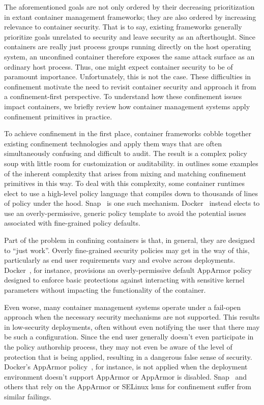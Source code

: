 \documentclass[
  fontsize=12pt,
  titlepage=firstiscover,
  paper=letter,
oneside,
  cleardoublepage=plain,
  parskip=half-,
  DIV=10,
  parindent,
  appendixprefix,
  chapterprefix,
  listof=totoc,
]{scrbook}
\begin{document}
The aforementioned goals are not only ordered by their decreasing prioritization in extant
container management frameworks; they are also ordered by increasing relevance to
container security. That is to say, existing frameworks generally prioritize goals
unrelated to security and leave security as an afterthought. Since containers are really
just process groups running directly on the host operating system, an unconfined container
therefore exposes the same attack surface as an ordinary host process. Thus, one might
expect container security to be of paramount importance. Unfortunately, this is not the
case. These difficulties in confinement motivate the need to revisit container security
and approach it from a confinement-first perspective. To understand how these confinement
issues impact containers, we briefly review how container management systems apply
confinement primitives in practice.

To achieve confinement in the first place, container frameworks cobble together existing
confinement technologies and apply them ways that are often simultaneously confusing and
difficult to audit. The result is a complex policy soup with little room for customization
or auditability.  in  outlines some examples
of the inherent complexity that arises from mixing and matching confinement primitives in
this way. To deal with this complexity, some container runtimes elect to use a high-level
policy language that compiles down to thousands of lines of policy under the hood. Snap~\cite{snap}
is one such mechanism. Docker~\cite{docker_security, docker_default_apparmor, docker_apparmor} instead
elects to use an overly-permissive, generic policy template to avoid the potential issues
associated with fine-grained policy defaults.



Part of the problem in confining containers is that, in general, they are designed to
\enquote{just work}. Overly fine-grained security policies may get in the way of this,
particularly as end user requirements vary and evolve across deployments.
Docker~\cite{docker_security}, for instance, provisions an overly-permissive default
AppArmor policy~\cite{docker_default_apparmor} designed to enforce basic protections
against interacting with sensitive kernel parameters without impacting the functionality
of the container.

Even worse, many container management systems operate under a fail-open approach when the
necessary security mechanisms are not supported. This results in low-security deployments,
often without even notifying the user that there may be such a configuration. Since the
end user generally doesn't even participate in the policy authorship process, they may not
even be aware of the level of protection that is being applied, resulting in a dangerous
false sense of security. Docker's AppArmor policy~\cite{docker_apparmor,
docker_default_apparmor}, for instance, is not applied when the deployment environment
doesn't support AppArmor or AppArmor is disabled. Snap~\cite{snap} and others that rely on
the AppArmor or SELinux \glspl{lsm} for confinement suffer from similar failings.
\end{document}
